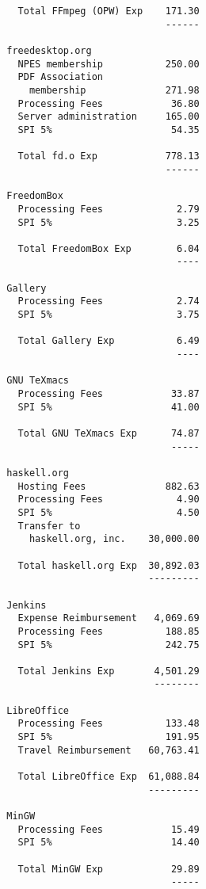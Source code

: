 \documentclass[letterpaper]{report}
\begin{document}
\begin{verbatim}
          Total FFmpeg (OPW) Exp    171.30
                                    ------

        freedesktop.org
          NPES membership           250.00
          PDF Association
            membership              271.98
          Processing Fees            36.80
          Server administration     165.00
          SPI 5%                     54.35

          Total fd.o Exp            778.13
                                    ------

        FreedomBox
          Processing Fees             2.79
          SPI 5%                      3.25

          Total FreedomBox Exp        6.04
                                      ----

        Gallery
          Processing Fees             2.74
          SPI 5%                      3.75

          Total Gallery Exp           6.49
                                      ----

        GNU TeXmacs
          Processing Fees            33.87
          SPI 5%                     41.00

          Total GNU TeXmacs Exp      74.87
                                     -----

        haskell.org
          Hosting Fees              882.63
          Processing Fees             4.90
          SPI 5%                      4.50
          Transfer to
            haskell.org, inc.    30,000.00

          Total haskell.org Exp  30,892.03
                                 ---------

        Jenkins
          Expense Reimbursement   4,069.69
          Processing Fees           188.85
          SPI 5%                    242.75

          Total Jenkins Exp       4,501.29
                                  --------

        LibreOffice
          Processing Fees           133.48
          SPI 5%                    191.95
          Travel Reimbursement   60,763.41

          Total LibreOffice Exp  61,088.84
                                 ---------

        MinGW
          Processing Fees            15.49
          SPI 5%                     14.40

          Total MinGW Exp            29.89
                                     -----


\end{verbatim}
\end{document}
